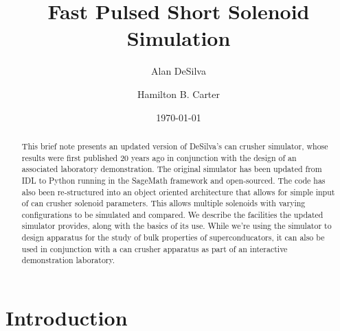 \documentclass[prb,preprint]{revtex4-1}
\begin{document}

\title{Fast Pulsed Short Solenoid Simulation
}

\author{Alan DeSilva}

\author{Hamilton B. Carter}


\date{\today}

\begin{abstract}
This brief note  presents an updated version of DeSilva's can crusher simulator, whose results were first published 20 years ago in conjunction with the design of an associated laboratory demonstration.  The original simulator has been updated from IDL to Python running in the SageMath framework and open-sourced.  The code has also been re-structured into an object oriented architecture that allows for simple input of can crusher solenoid parameters.  This allows multiple solenoids with varying configurations to be simulated and compared.  We describe the facilities the updated simulator provides, along with the basics of its use.  While we're using the simulator to design apparatus for the study of bulk properties of superconducators, it can also be used in conjunction with a can crusher apparatus as part of an interactive demonstration laboratory.
\end{abstract}

\maketitle %


\section{Introduction} %
\end{document}
